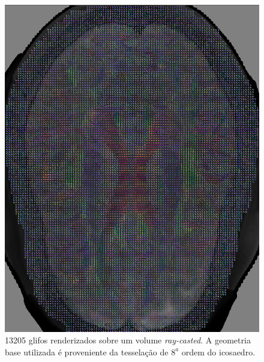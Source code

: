 \documentclass[
    12pt,                %
    oneside,            %
    a4paper,            %
    english,            %
    french,                %
    spanish,            %
    brazil                %
    ]{abntex2}
\begin{document}
  \begin{figure}[H]
     \centering
     \includegraphics[width=1.0\linewidth, angle=0]{figs/Renderizacao_glifos_evolucao/Adaptividade-multimodal/Fatia_642.png}
      \caption{13205 glifos renderizados sobre um volume \textit{ray-casted}. A geometria base utilizada é proveniente da tesselação de $8^a$ ordem do icosaedro.}
       \label{fig::qualidade_visual_longe_highres}
 \end{figure}



\end{document}
